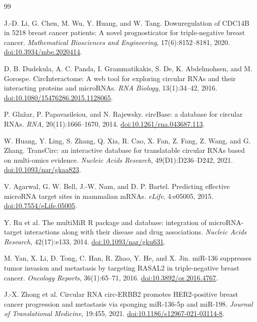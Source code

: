 \documentclass[11pt]{article}
\begin{document}
\begin{thebibliography}{99}
\small

J.-D. Li, G. Chen, M. Wu, Y. Huang, and W. Tang.
Downregulation of CDC14B in 5218 breast cancer patients: A novel prognosticator for triple-negative breast cancer.
\textit{Mathematical Biosciences and Engineering}, 17(6):8152--8181, 2020.
\href{https://doi.org/10.3934/mbe.2020414}{doi:10.3934/mbe.2020414}.

D. B. Dudekula, A. C. Panda, I. Grammatikakis, S. De, K. Abdelmohsen, and M. Gorospe.
CircInteractome: A web tool for exploring circular RNAs and their interacting proteins and microRNAs.
\textit{RNA Biology}, 13(1):34--42, 2016.
\href{https://doi.org/10.1080/15476286.2015.1128065}{doi:10.1080/15476286.2015.1128065}.

P. Gla\v{z}ar, P. Papavasileiou, and N. Rajewsky.
circBase: a database for circular RNAs.
\textit{RNA}, 20(11):1666--1670, 2014.
\href{https://doi.org/10.1261/rna.043687.113}{doi:10.1261/rna.043687.113}.

W. Huang, Y. Ling, S. Zhang, Q. Xia, R. Cao, X. Fan, Z. Fang, Z. Wang, and G. Zhang.
TransCirc: an interactive database for translatable circular RNAs based on multi-omics evidence.
\textit{Nucleic Acids Research}, 49(D1):D236--D242, 2021.
\href{https://doi.org/10.1093/nar/gkaa823}{doi:10.1093/nar/gkaa823}.

V. Agarwal, G. W. Bell, J.-W. Nam, and D. P. Bartel.
Predicting effective microRNA target sites in mammalian mRNAs.
\textit{eLife}, 4:e05005, 2015.
\href{https://doi.org/10.7554/eLife.05005}{doi:10.7554/eLife.05005}.

Y. Ru et al.
The multiMiR R package and database: integration of microRNA-target interactions along with their disease and drug associations.
\textit{Nucleic Acids Research}, 42(17):e133, 2014.
\href{https://doi.org/10.1093/nar/gku631}{doi:10.1093/nar/gku631}.

M. Yan, X. Li, D. Tong, C. Han, R. Zhao, Y. He, and X. Jin.
miR-136 suppresses tumor invasion and metastasis by targeting RASAL2 in triple-negative breast cancer.
\textit{Oncology Reports}, 36(1):65--71, 2016.
\href{https://doi.org/10.3892/or.2016.4767}{doi:10.3892/or.2016.4767}.

J.-X. Zhong et al.
Circular RNA circ-ERBB2 promotes HER2-positive breast cancer progression and metastasis via sponging miR-136-5p and miR-198.
\textit{Journal of Translational Medicine}, 19:455, 2021.
\href{https://doi.org/10.1186/s12967-021-03114-8}{doi:10.1186/s12967-021-03114-8}.


\end{thebibliography}
\end{document}
